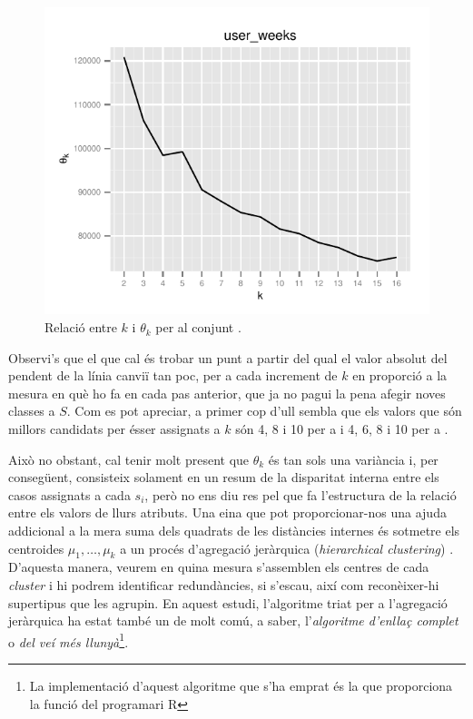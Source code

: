 \documentclass[
	a4paper,
	twoside,
	justified
]{tufte-book}
\begin{document}
\begin{figure}
\begin{center}
\includegraphics{week_presence_clust_wss_line}
\caption{
	\label{graph:week_presence_clust_wss_line}
	Relació entre $k$ i $\theta_k$ per al conjunt .
}
\end{center}
\end{figure}

Observi's que el que cal és trobar un punt a partir del qual el valor absolut del pendent de la línia canviï tan poc, per a cada increment de $k$ en proporció a la mesura en què ho fa en cada pas anterior, que ja no pagui la pena afegir noves classes a $S$. Com es pot apreciar, a primer cop d'ull sembla que els valors que són millors candidats per ésser assignats a $k$ són 4, 8 i 10 per a  i 4, 6, 8 i 10 per a . 

Això no obstant, cal tenir molt present que $\theta_k$ és tan sols una variància i, per consegüent, consisteix solament en un resum de la disparitat interna entre els casos assignats a cada $s_i$, però no ens diu res pel que fa l'estructura de la relació entre els valors de llurs atributs. Una eina que pot proporcionar-nos una ajuda addicional a la mera suma dels quadrats de les distàncies internes és sotmetre els centroides $\mu_1, \ldots, \mu_k$ a un procés d'agregació jeràrquica (\emph{hierarchical clustering}) \citep[p. 520-28]{hastie09}. D'aquesta manera, veurem en quina mesura s'assemblen els centres de cada \emph{cluster} i hi podrem identificar redundàncies, si s'escau, així com reconèixer-hi supertipus que les agrupin. En aquest estudi, l'algoritme triat per a l'agregació jeràrquica ha estat també un de molt comú, a saber, l'\emph{algoritme d'enllaç complet} o \emph{del veí més llunyà}\footnote{La implementació d'aquest algoritme que s'ha emprat és la que proporciona la funció  del programari R}. 
\end{document}
